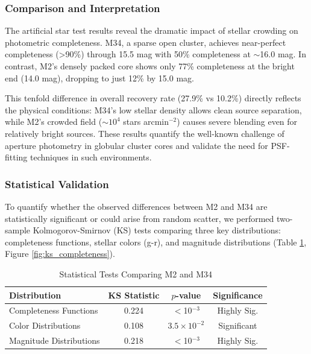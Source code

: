\documentclass[linenumbers,trackchanges,twocolumn]{aastex701}
\begin{document}
\subsubsection{Comparison and Interpretation}

The artificial star test results reveal the dramatic impact of stellar crowding on photometric completeness. M34, a sparse open cluster, achieves near-perfect completeness (>90\%) through 15.5 mag with 50\% completeness at $\sim$16.0 mag. In contrast, M2's densely packed core shows only 77\% completeness at the bright end (14.0 mag), dropping to just 12\% by 15.0 mag.

This tenfold difference in overall recovery rate (27.9\% vs 10.2\%) directly reflects the physical conditions: M34's low stellar density allows clean source separation, while M2's crowded field ($\sim 10^4$ stars arcmin$^{-2}$) causes severe blending even for relatively bright sources. These results quantify the well-known challenge of aperture photometry in globular cluster cores and validate the need for PSF-fitting techniques in such environments.

\subsubsection{Statistical Validation}

To quantify whether the observed differences between M2 and M34 are statistically significant or could arise from random scatter, we performed two-sample Kolmogorov-Smirnov (KS) tests \citep{1933AnMat..33..457K,1951AnMSt..22..469S} comparing three key distributions: completeness functions, stellar colors (g-r), and magnitude distributions (Table \ref{tab:ks_tests}, Figure \ref{fig:ks_completeness}).

\begin{table}[ht]
\centering
\caption{Statistical Tests Comparing M2 and M34}
\label{tab:ks_tests}
\begin{tabular}{lccc}
\hline\hline
Distribution & KS Statistic & $p$-value & Significance \\
\hline
Completeness Functions & 0.224 & $<$10$^{-3}$ & Highly Sig. \\
Color Distributions & 0.108 & $3.5 \times 10^{-2}$ & Significant \\
Magnitude Distributions & 0.218 & $<$10$^{-3}$ & Highly Sig. \\
\hline\hline
\end{tabular}
\end{table}
\end{document}
